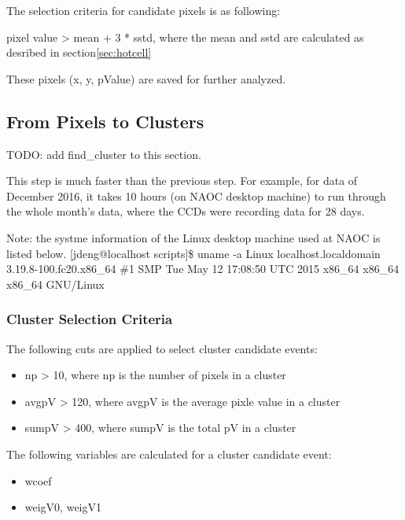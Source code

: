 \documentclass[12pt,twoside,letterpaper]{article}
\begin{document}
The selection criteria for candidate pixels is as following: 
 
 pixel value > mean + 3 * sstd, where the mean and sstd are calculated
 as desribed in section\ref{sec:hotcell}

These pixels (x, y, pValue) are saved for further analyzed.  





\subsection{From Pixels to Clusters} 

TODO: add find\_cluster to this section.

This step is much faster than the previous step. For example, for data
of December 2016, it takes 10 hours (on NAOC desktop machine) to run through the whole month's
data, where the CCDs were recording data for 28 days. 

Note: the systme information of the Linux desktop machine used at NAOC is listed below.
[jdeng@localhost scripts]\$ uname -a
Linux localhost.localdomain 3.19.8-100.fc20.x86\_64 \#1 SMP Tue May 12 17:08:50 UTC 2015 x86\_64 x86\_64 x86\_64 GNU/Linux

\subsubsection{Cluster Selection Criteria}{\label{Sec:clusterSelection}}
The following cuts are applied to select cluster candidate events: 

       \begin{itemize}
	    \item np > 10, where np is the  number of pixels in a cluster
	    \item avgpV > 120, where avgpV is the average pixle value in a cluster
	    \item sumpV > 400, where sumpV is the total pV in a cluster
       \end{itemize}

The following variables are calculated for a cluster candidate event:

       \begin{itemize}
           \item wcoef
           \item weigV0, weigV1
       \end{itemize}
\end{document}
